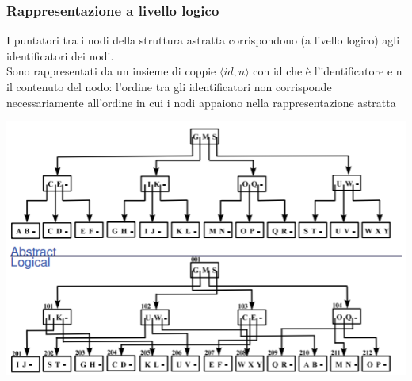 \subsubsection{Rappresentazione a livello logico}
I puntatori tra i nodi della struttura astratta corrispondono (a livello logico) agli identificatori dei nodi.\\
Sono rappresentati da un insieme di coppie \(\langle id, n \rangle\) con id che è l'identificatore e n il contenuto del nodo: l'ordine tra gli identificatori non corrisponde necessariamente all'ordine in cui i nodi appaiono nella rappresentazione astratta
\begin{center}
    \includegraphics[scale=0.8]{img/abslog.png}
\end{center}
